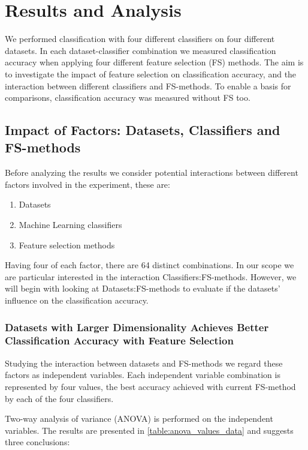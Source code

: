 \chapter{Results and Analysis}

We performed classification with four different classifiers on four different datasets. In each dataset-classifier combination we measured classification accuracy when applying four different feature selection (FS) methods. The aim is to investigate the impact of feature selection on classification accuracy, and the interaction between different classifiers and FS-methods. To enable a basis for comparisons, classification accuracy was measured without FS too.

\section{Impact of Factors: Datasets, Classifiers and FS-methods}
\label{Variation_among_factors}

Before analyzing the results we consider potential interactions between different factors involved in the experiment, these are:

\begin{enumerate}
  \item Datasets
  \item Machine Learning classifiers
  \item Feature selection methods
\end{enumerate}

Having four of each factor, there are 64 distinct combinations. In our scope we are particular interested in the interaction Classifiers:FS-methods. However, we will begin with looking at Datasets:FS-methods to evaluate if the datasets' influence on the classification accuracy.

\subsection{Datasets with Larger Dimensionality Achieves Better Classification Accuracy with Feature Selection}

Studying the interaction between datasets and FS-methods we regard these factors as independent variables. Each independent variable combination is represented by four values, the best accuracy achieved with current FS-method by each of the four classifiers.

Two-way analysis of variance (ANOVA) is performed on the independent variables. The results are presented in \ref{table:anova_values_data} and suggests three conclusions:

